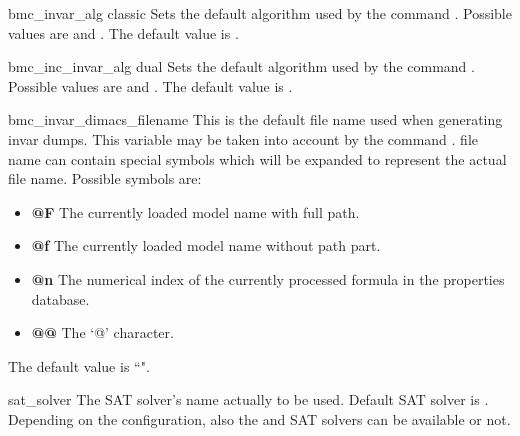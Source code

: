 





\label{bmc::dual}

\begin{nusmvVar} {bmc\_invar\_alg}
{}{classic}
Sets the default algorithm used by the command . 
Possible values are  and .
The default value is .
\end{nusmvVar}

\begin{nusmvVar} {bmc\_inc\_invar\_alg}
{}{dual}
Sets the default algorithm used by the command . 
Possible values are  and .
The default value is .
\end{nusmvVar}

\begin{nusmvVar} {bmc\_invar\_dimacs\_filename}{}{}
This is the default file name used when generating \dimacs invar
dumps. This variable may be taken into account by the command
.  \dimacs file name can contain special symbols which will
be expanded to represent the actual file name. Possible symbols are:
\begin{itemize}
\item {\bf @F}
The currently loaded model name with full path. 
\item {\bf @f}
The currently loaded model name without path part. 
\item {\bf @n}
The numerical index of the currently processed formula in the properties
database.
\item {\bf @@}
The `@' character.   
\end{itemize}
The default value is ``".\\
\end{nusmvVar}

\begin{nusmvVar} {sat\_solver}{}{\SIM}
The SAT solver's name actually to be used. Default SAT solver is \SIM.
Depending on the \nusmv configuration, also the \zchaff and \minisat
SAT solvers can be available or not. \zchaffminisatnotice
\end{nusmvVar}

